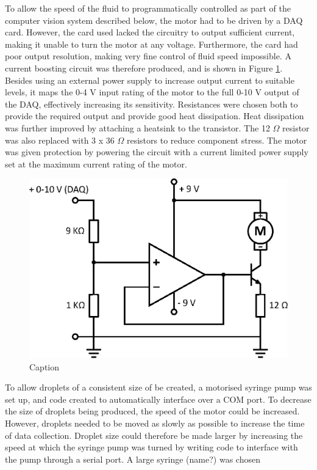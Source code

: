 \documentclass{physics_article_B}
\begin{document}
        To allow the speed of the fluid to programmatically controlled as part of the computer vision system described below, the motor had to be driven by a DAQ card. However, the card used lacked the circuitry to output sufficient current, making it unable to turn the motor at any voltage. Furthermore, the card had poor output resolution, making very fine control of fluid speed impossible. A current boosting circuit was therefore produced, and is shown in Figure \ref{fig:MotorCircuit}. Besides using an external power supply to increase output current to suitable levels, it maps the 0-4 V input rating of the motor to the full 0-10 V output of the DAQ, effectively increasing its sensitivity. Resistances were chosen both to provide the required output and provide good heat dissipation. Heat dissipation was further improved by attaching a heatsink to the transistor. The 12 $\Omega$ resistor was also replaced with 3 x 36 $\Omega$ resistors to reduce component stress. The motor was given protection by powering the circuit with a current limited power supply set at the maximum current rating of the motor. 
        
            \begin{figure}[H]
                \centering
                \hspace*{-1.8cm}\includegraphics[scale=0.8]{Figures/MotorCircuit.eps}
                \caption{Caption}
                \label{fig:MotorCircuit}
            \end{figure}
        
        To allow droplets of a consistent size of be created, a motorised syringe pump was set up, and code created to automatically interface over a COM port. To decrease the size of droplets being produced, the speed of the motor could be increased. However, droplets needed to be moved as slowly as possible to increase the time of data collection. Droplet size could therefore be made larger by increasing the speed at which the syringe pump was turned by writing code to interface with the pump through a serial port. A large syringe (name?) was chosen
        
\end{document}
